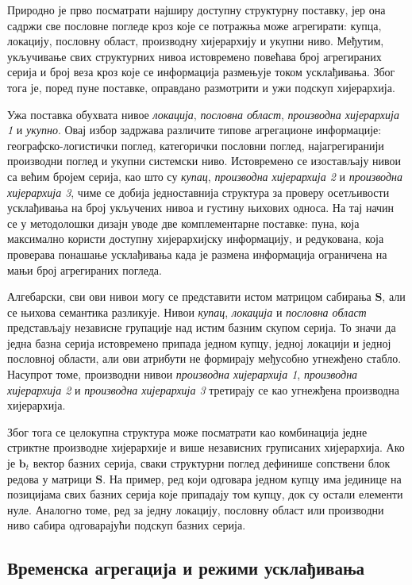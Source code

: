 \documentclass[12pt,oneside]{memoir}
\begin{document}
Природно је прво посматрати најширу доступну структурну поставку, јер она садржи све пословне погледе кроз које се потражња може агрегирати: купца, локацију, пословну област, производну хијерархију и укупни ниво. Међутим, укључивање свих структурних нивоа истовремено повећава број агрегираних серија и број веза кроз које се информација размењује током усклађивања. Због тога је, поред пуне поставке, оправдано размотрити и ужи подскуп хијерархија.

Ужа поставка обухвата нивое \textit{локација}, \textit{пословна област}, \textit{производна хијерархија 1} и \textit{укупно}. Овај избор задржава различите типове агрегационе информације: географско-логистички поглед, категорички пословни поглед, најагрегиранији производни поглед и укупни системски ниво. Истовремено се изостављају нивои са већим бројем серија, као што су \textit{купац}, \textit{производна хијерархија 2} и \textit{производна хијерархија 3}, чиме се добија једноставнија структура за проверу осетљивости усклађивања на број укључених нивоа и густину њихових односа. На тај начин се у методолошки дизајн уводе две комплементарне поставке: пуна, која максимално користи доступну хијерархијску информацију, и редукована, која проверава понашање усклађивања када је размена информација ограничена на мањи број агрегираних погледа.

Алгебарски, сви ови нивои могу се представити истом матрицом сабирања $\mathbf{S}$, али се њихова семантика разликује. Нивои \textit{купац}, \textit{локација} и \textit{пословна област} представљају независне групације над истим базним скупом серија. То значи да једна базна серија истовремено припада једном купцу, једној локацији и једној пословној области, али ови атрибути не формирају међусобно угнежђено стабло. Насупрот томе, производни нивои \textit{производна хијерархија 1}, \textit{производна хијерархија 2} и \textit{производна хијерархија 3} третирају се као угнежђена производна хијерархија.

Због тога се целокупна структура може посматрати као комбинација једне стриктне производне хијерархије и више независних груписаних хијерархија. Ако је $\mathbf{b}_t$ вектор базних серија, сваки структурни поглед дефинише сопствени блок редова у матрици $\mathbf{S}$. На пример, ред који одговара једном купцу има јединице на позицијама свих базних серија које припадају том купцу, док су остали елементи нуле. Аналогно томе, ред за једну локацију, пословну област или производни ниво сабира одговарајући подскуп базних серија.

\subsection{Временска агрегација и режими усклађивања}
\end{document}
